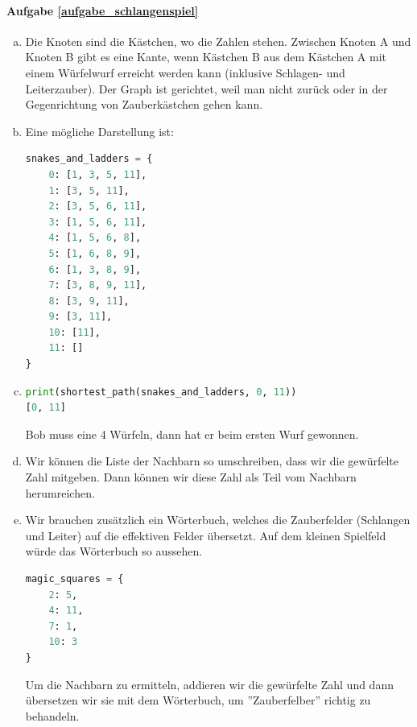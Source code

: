 \paragraph{Aufgabe \ref{aufgabe_schlangenspiel}}
\begin{enumerate}[(a)]
    \item Die Knoten sind die Kästchen, wo die Zahlen stehen. Zwischen Knoten A und Knoten B gibt es eine Kante, wenn Kästchen B aus dem Kästchen A mit einem Würfelwurf erreicht werden kann (inklusive Schlagen- und Leiterzauber). Der Graph ist gerichtet, weil man nicht zurück oder in der Gegenrichtung von Zauberkästchen gehen kann.
    \item Eine mögliche Darstellung ist:
    \begin{lstlisting}[language=Python]
snakes_and_ladders = {
    0: [1, 3, 5, 11],
    1: [3, 5, 11],
    2: [3, 5, 6, 11],
    3: [1, 5, 6, 11],
    4: [1, 5, 6, 8],
    5: [1, 6, 8, 9],
    6: [1, 3, 8, 9],
    7: [3, 8, 9, 11],
    8: [3, 9, 11],
    9: [3, 11],
    10: [11],
    11: []
}
    \end{lstlisting}
    
    \item
    \begin{lstlisting}[language=Python]
print(shortest_path(snakes_and_ladders, 0, 11))
[0, 11]
    \end{lstlisting}
    Bob muss eine 4 Würfeln, dann hat er beim ersten Wurf gewonnen.
    
    \item Wir können die Liste der Nachbarn so umschreiben, dass wir die gewürfelte Zahl mitgeben. Dann können wir diese Zahl als Teil vom Nachbarn herumreichen.
    \item Wir brauchen zusätzlich ein Wörterbuch, welches die Zauberfelder (Schlangen und Leiter) auf die effektiven Felder übersetzt. Auf dem kleinen Spielfeld würde das Wörterbuch so aussehen.
    \begin{lstlisting}[language=Python]
magic_squares = {
    2: 5,
    4: 11,
    7: 1,
    10: 3
}
    \end{lstlisting}
    Um die Nachbarn zu ermitteln, addieren wir die gewürfelte Zahl und dann übersetzen wir sie mit dem Wörterbuch, um ''Zauberfelber'' richtig zu behandeln.
    

\end{enumerate}
